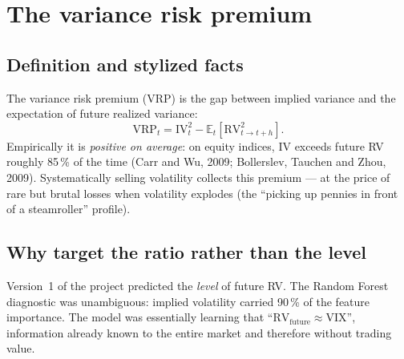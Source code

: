 \documentclass[11pt,a4paper]{article}
\newcommand{\RV}{\mathrm{RV}}
\newcommand{\IV}{\mathrm{IV}}
\newcommand{\E}{\mathbb{E}}
\begin{document}
\section{The variance risk premium}
\label{sec:vrp}

\subsection{Definition and stylized facts}

The variance risk premium (VRP) is the gap between implied variance and the
expectation of future realized variance:
\begin{equation}
\mathrm{VRP}_t = \IV_t^2 - \E_t\!\left[\RV^2_{t\to t+h}\right] .
\end{equation}
Empirically it is \emph{positive on average}: on equity indices, $\IV$
exceeds future RV roughly 85\,\% of the time (Carr and Wu, 2009; Bollerslev,
Tauchen and Zhou, 2009). Systematically selling volatility collects this
premium --- at the price of rare but brutal losses when volatility explodes
(the ``picking up pennies in front of a steamroller'' profile).

\subsection{Why target the ratio rather than the level}
\label{sec:target}

Version~1 of the project predicted the \emph{level} of future RV. The Random
Forest diagnostic was unambiguous: implied volatility carried 90\,\% of the
feature importance. The model was essentially learning that
``$\RV_{\text{future}} \approx \mathrm{VIX}$'', information already known to
the entire market and therefore without trading value.
\end{document}
